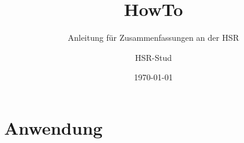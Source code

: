 \documentclass[
	titlepage=true %
]{scrartcl}
\title{HowTo}
\subtitle{Anleitung für Zusammenfassungen an der HSR}
\author{HSR-Stud}
\date{\today}
\begin{document}
\begin{titlepage}
	\thispagestyle{empty}
	\maketitle	
\end{titlepage}

\tableofcontents
\newpage




\section{Anwendung}
\end{document}

